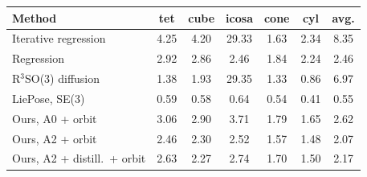 \begin{tabular}{@{}l cccccc@{}}
\toprule
Method & tet & cube & icosa & cone & cyl & avg. \\
\midrule
Iterative regression~\cite{hsiao2024liepose} & 4.25 & 4.20 & 29.33 & 1.63 & 2.34 & 8.35 \\
Regression~\cite{hsiao2024liepose} & 2.92 & 2.86 & 2.46 & 1.84 & 2.24 & 2.46 \\
R$^3$SO(3) diffusion~\cite{hsiao2024liepose} & 1.38 & 1.93 & 29.35 & 1.33 & 0.86 & 6.97 \\
LiePose, SE(3)~\cite{hsiao2024liepose} & 0.59 & 0.58 & 0.64 & 0.54 & 0.41 & 0.55 \\
\midrule
Ours, A0 + orbit & 3.06 & 2.90 & 3.71 & 1.79 & 1.65 & 2.62 \\
Ours, A2 + orbit & 2.46 & 2.30 & 2.52 & 1.57 & 1.48 & 2.07 \\
Ours, A2 + distill.\ + orbit & 2.63 & 2.27 & 2.74 & 1.70 & 1.50 & 2.17 \\
\bottomrule
\end{tabular}